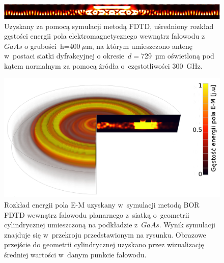 \begin{figure}[tb]
	\includegraphics[width=\textwidth]{images/thz/consrc_siatka1d_300GHz_d729um.png}
	\caption{Uzyskany za pomocą symulacji metodą FDTD, uśredniony rozkład gęstości energii pola elektromagnetycznego wewnątrz falowodu z~$GaAs$ o grubości~h=400$~\mu$m, na którym umieszczono antenę w~postaci siatki dyfrakcyjnej o okresie~$d=$729~µm oświetloną pod kątem normalnym za pomocą źródła o~częstotliwości 300~GHz.  }
	\label{fig:consrc_1d_f300Ghz}
\end{figure}

\begin{figure}[tb]
	\includegraphics[width=\textwidth]{images/antenaThz/tort.png}
	\caption{Rozkład energii pola E-M uzyskany w~symulacji metodą BOR FDTD wewnątrz falowodu planarnego z~siatką o~geometrii cylindrycznej umieszczoną na podkładzie z~$GaAs$. Wynik symulacji znajduje się w~przekroju przedstawionym na rysunku. Obrazowe przejście do geometrii cylindrycznej uzyskano przez wizualizację średniej wartości w~danym punkcie falowodu.}	
	\label{fig:concent_modfalo}
\end{figure}



